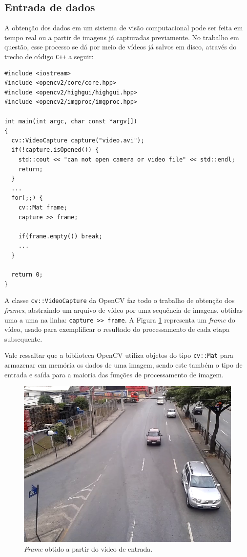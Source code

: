 \subsection{Entrada de dados} %
\label{sub:entrada_de_dados}

A obtenção dos dados em um sistema de visão computacional pode ser feita em tempo real ou a partir de imagens já capturadas previamente. No trabalho em questão, esse processo se dá por meio de vídeos já salvos em disco, através do trecho de código \verb!C++! a seguir:

\begin{lstlisting}
#include <iostream>
#include <opencv2/core/core.hpp>
#include <opencv2/highgui/highgui.hpp>
#include <opencv2/imgproc/imgproc.hpp>

int main(int argc, char const *argv[])
{
  cv::VideoCapture capture("video.avi");
  if(!capture.isOpened()) {
    std::cout << "can not open camera or video file" << std::endl;
    return;
  }
  ...  
  for(;;) {
    cv::Mat frame;
    capture >> frame;

    if(frame.empty()) break; 
    ...  
  }

  return 0;
}
\end{lstlisting}

A classe \verb!cv::VideoCapture! da OpenCV faz todo o trabalho de obtenção dos \textit{frames}, abstraindo um arquivo de vídeo por uma sequência de imagens, obtidas uma a uma na linha: \verb!capture >> frame!. A Figura \ref{fig:frame_in} representa um \textit{frame} do vídeo, usado para exemplificar o resultado do processamento de cada etapa subsequente. 

Vale ressaltar que a biblioteca OpenCV utiliza objetos do tipo \verb!cv::Mat! para armazenar em memória os dados de uma imagem, sendo este também o tipo de entrada e saída para a maioria das funções de processamento de imagem.

\begin{figure}[ht]
  \begin{center}
    \includegraphics[scale=0.5]{imgs/frame.png}
  \end{center}
  \caption{\textit{Frame} obtido a partir do vídeo de entrada.}
  \label{fig:frame_in}
\end{figure}

